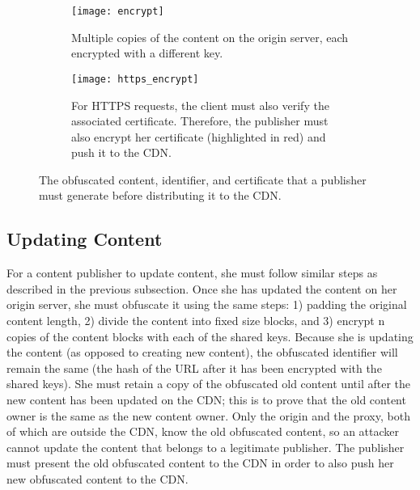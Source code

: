 \begin{figure}
\centering
   \begin{subfigure}[b]{0.45\textwidth}
   \texttt{[image: encrypt]}
   \caption{Multiple copies of the content on the origin server, each encrypted with a different key.}
   \label{fig:encrypt} 
\end{subfigure}

\begin{subfigure}[b]{0.45\textwidth}
   \texttt{[image: https\_encrypt]}
   \caption{For HTTPS requests, the client must also verify the associated certificate.  Therefore, the 
publisher must also encrypt her certificate (highlighted in red) and push it to the CDN.}
   \label{fig:https_encrypt}
\end{subfigure}

\caption{The obfuscated content, identifier, and certificate that a publisher must 
generate before distributing it to the CDN.}
\end{figure}

\subsection{Updating Content}
For a content publisher to update content, she must follow similar steps as described in the previous subsection.  
Once she has updated the content on her origin server, she must obfuscate it using the same steps: 1) padding the 
original content length, 2) divide the content into fixed size blocks, and 3) encrypt n copies of the content blocks 
with each of the shared keys.  Because she is updating the content (as opposed to creating new content), the 
obfuscated identifier will remain the same (the hash of the URL after it has been encrypted with the shared keys).  She must 
retain a copy of the obfuscated old content until after the new content has been updated on the CDN; this is to prove 
that the old content owner is the same as the new content owner.  Only the origin and the proxy, both of which are 
outside the CDN, know the old obfuscated content, so an attacker cannot update the content that belongs to 
a legitimate publisher.  The publisher must present the old obfuscated content to the CDN in order to also push 
her new obfuscated content to the CDN.  

